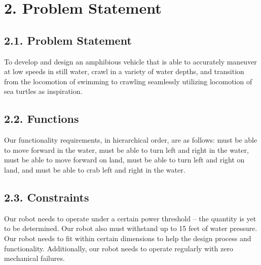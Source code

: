 \documentclass[10pt]{article}
\begin{document}
\section{2. Problem Statement}
\subsection{2.1. Problem Statement}
To develop and design an amphibious vehicle that is able to accurately maneuver at low speeds in still water, crawl in a variety of water depths, and transition  from the locomotion of swimming to crawling seamlessly utilizing locomotion of sea turtles as inspiration.
\subsection{2.2. Functions}
Our functionality requirements, in hierarchical order, are as follows: must be able to move forward in the water, must be able to turn left and right in the water, must be able to move forward on land, must be able to turn left and right on land, and must be able to crab left and right in the water.
\subsection{2.3. Constraints}
Our robot needs to operate under a certain power threshold – the quantity is yet to be determined. Our robot also must withstand up to 15 feet of water pressure. Our robot needs to fit within certain dimensions to help the design process and functionality. Additionally, our robot needs to operate regularly with zero mechanical failures. 
\end{document}
